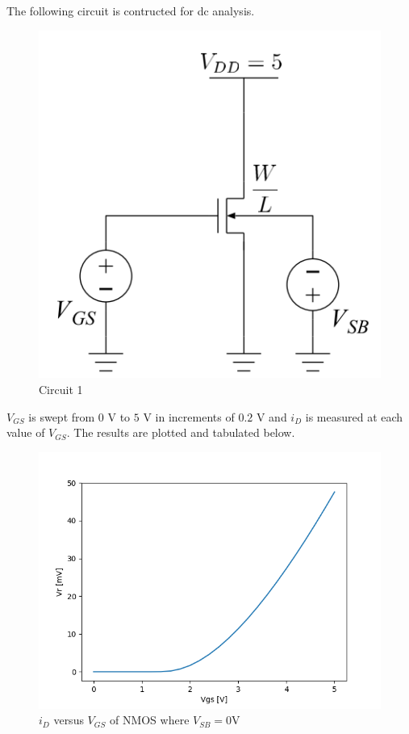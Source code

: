 The following circuit is contructed for dc analysis.

\FloatBarrier

\begin{figure}[h!]
	\centering
	\includegraphics[scale=0.75]{../images/circuit_1.PNG}
	\caption{Circuit 1}
	\label{fig:circuit_1}
\end{figure}

\FloatBarrier

$V_{GS}$ is swept from $0$ \si{\volt} to $5$ \si{\volt} in increments of $0.2$ \si{\volt} and $i_D$ is measured at each value of $V_{GS}$. 
The results are plotted and tabulated below.

\FloatBarrier

\begin{figure}[h!]
	\centering
	\includegraphics[scale=0.75]{../images/data_1.PNG}
	\caption{$i_{D}$ versus $V_{GS}$ of NMOS where $V_{SB}= 0$\si{\volt}}
	\label{fig:data_1}
\end{figure}

